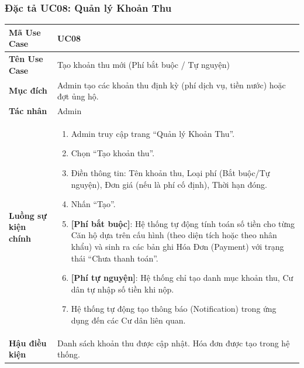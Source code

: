 \documentclass[12pt,a4paper]{article}
\begin{document}
\subsubsection{Đặc tả UC08: Quản lý Khoản Thu}
\begin{table}[H]
    \centering
    \renewcommand{\arraystretch}{1.2}
    \begin{tabularx}{\textwidth}{|l|X|}
    \hline
    \textbf{Mã Use Case} & \textbf{UC08} \\
    \hline
    \textbf{Tên Use Case} & Tạo khoản thu mới (Phí bắt buộc / Tự nguyện) \\
    \hline
    \textbf{Mục đích} & Admin tạo các khoản thu định kỳ (phí dịch vụ, tiền nước) hoặc đợt ủng hộ. \\
    \hline
    \textbf{Tác nhân} & Admin \\
    \hline
    \textbf{Luồng sự kiện chính} &
    \begin{enumerate}
        \item Admin truy cập trang ``Quản lý Khoản Thu''.
        \item Chọn ``Tạo khoản thu''.
        \item Điền thông tin: Tên khoản thu, Loại phí (Bắt buộc/Tự nguyện), Đơn giá (nếu là phí cố định), Thời hạn đóng.
        \item Nhấn ``Tạo''.
        \item \textbf{[Phí bắt buộc]}: Hệ thống tự động tính toán số tiền cho từng Căn hộ dựa trên cấu hình (theo diện tích hoặc theo nhân khẩu) và sinh ra các bản ghi Hóa Đơn (Payment) với trạng thái ``Chưa thanh toán''.
        \item \textbf{[Phí tự nguyện]}: Hệ thống chỉ tạo danh mục khoản thu, Cư dân tự nhập số tiền khi nộp.
        \item Hệ thống tự động tạo thông báo (Notification) trong ứng dụng đến các Cư dân liên quan.
    \end{enumerate} \\
    \hline
    \textbf{Hậu điều kiện} & Danh sách khoản thu được cập nhật. Hóa đơn được tạo trong hệ thống. \\
    \hline
    \end{tabularx}
\end{table}

\end{document}
